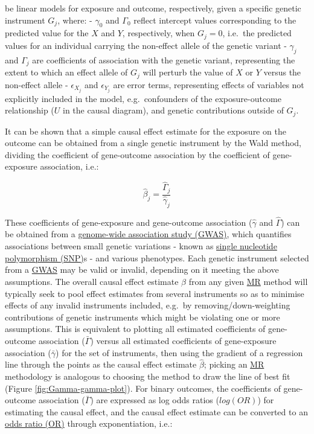 \documentclass[
]{article}
\begin{document}
be linear models for exposure and outcome, respectively, given a specific genetic instrument \(G_j\), where:
- \(\gamma_0\) and \(\Gamma_0\) reflect intercept values corresponding to the predicted value for the \(X\) and \(Y\), respectively, when \(G_j = 0\), i.e.~the predicted values for an individual carrying the non-effect allele of the genetic variant
- \(\gamma_j\) and \(\Gamma_j\) are coefficients of association with the genetic variant, representing the extent to which an effect allele of \(G_j\) will perturb the value of \(X\) or \(Y\) versus the non-effect allele
- \(\epsilon_{X_j}\) and \(\epsilon_{Y_j}\) are error terms, representing effects of variables not explicitly included in the model, e.g.~confounders of the exposure-outcome relationship (\(U\) in the causal diagram), and genetic contributions outside of \(G_j\).

It can be shown that a simple causal effect estimate for the exposure on the outcome can be obtained from a single genetic instrument by the Wald method, dividing the coefficient of gene-outcome association by the coefficient of gene-exposure association, i.e.:

\begin{equation} 
\hat{\beta}_j = \frac {\hat{\Gamma}_j} {\hat{\gamma}_j}
\end{equation}

These coefficients of gene-exposure and gene-outcome association (\(\hat{\gamma}\) and \(\hat{\Gamma}\)) can be obtained from a \hyperref[acronyms_GWAS]{genome-wide association study (GWAS)}, which quantifies associations between small genetic variations - known as \hyperref[acronyms_SNP]{single nucleotide polymorphism (SNP)}s - and various phenotypes. Each genetic instrument selected from a \hyperref[acronyms_GWAS]{GWAS} may be valid or invalid, depending on it meeting the above assumptions. The overall causal effect estimate \(\hat{\beta}\) from any given \hyperref[acronyms_MR]{MR} method will typically seek to pool effect estimates from several instruments so as to minimise effects of any invalid instruments included, e.g.~by removing/down-weighting contributions of genetic instruments which might be violating one or more assumptions. This is equivalent to plotting all estimated coefficients of gene-outcome association (\(\bar{\Gamma}\)) versus all estimated coefficients of gene-exposure association (\(\bar{\gamma}\)) for the set of instruments, then using the gradient of a regression line through the points as the causal effect estimate \(\hat{\beta}\); picking an \hyperref[acronyms_MR]{MR} methodology is analogous to choosing the method to draw the line of best fit (Figure \ref{fig:Gamma-gamma-plot}). For binary outcomes, the coefficients of gene-outcome association (\(\bar{\Gamma}\)) are expressed as log odds ratios (\(log(OR)\)) for estimating the causal effect, and the causal effect estimate can be converted to an \hyperref[acronyms_OR]{odds ratio (OR)} through exponentiation, i.e.:
\end{document}
